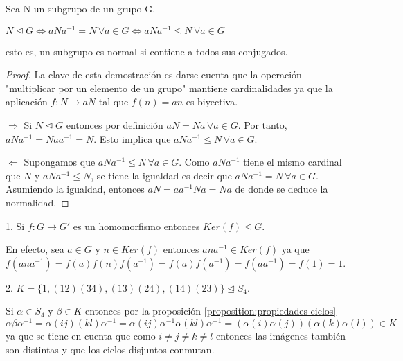 \begin{theorem}\label{theorem:criterio-normalidad}
Sea N un subgrupo de un grupo G. 

$N \unlhd G \iff aNa^{-1} = N  \, \forall a \in G \iff aNa^{-1} \le N \, \forall a \in G$ 

esto es, un subgrupo es normal si contiene a todos sus conjugados.
\end{theorem}
\begin{proof}
La clave de esta demostración es darse cuenta que la operación "multiplicar por un elemento de un grupo" mantiene cardinalidades ya que la aplicación $f:N \rightarrow aN$ tal que $f(n) = an$ es biyectiva.

$\Rightarrow$ Si $N \unlhd G$ entonces por definición $aN = Na \, \forall a \in G$. Por tanto, $aNa^{-1} = Naa^{-1} = N$. Esto implica que $aNa^{-1} \le N \, \forall a \in G$.

$\Leftarrow$ Supongamos que $aNa^{-1} \le N \, \forall a \in G$. Como $aNa^{-1}$ tiene el mismo cardinal que $N$ y $aNa^{-1} \le N$, se tiene la igualdad es decir que $aNa^{-1} = N \, \forall a \in G$. Asumiendo la igualdad, entonces $aN = aa^{-1}Na = Na$ de donde se deduce la normalidad.
\end{proof}

\begin{example}
1. Si $f:G \rightarrow G'$ es un homomorfismo entonces $Ker(f) \trianglelefteq G$.

En efecto, sea $a \in G$ y $n \in Ker(f)$ entonces $ana^{-1} \in Ker(f)$ ya que $f(ana^{-1}) = f(a)f(n)f(a^{-1}) = f(a)f(a^{-1}) = f(aa^{-1}) = f(1) = 1$.

2. $K = \{1,(12)(34),(13)(24),(14)(23)\} \trianglelefteq S_4$.

Si $\alpha \in S_4$ y $\beta \in K$ entonces por la proposición \ref{proposition:propiedades-ciclos} $\alpha \beta  \alpha^{-1} = \alpha (ij)(kl) \alpha^{-1} =\alpha (ij) \alpha^{-1} \alpha (kl) \alpha^{-1} = (\alpha(i) \alpha(j))(\alpha(k) \alpha(l)) \in K$ ya que se tiene en cuenta que como  $i \neq j \neq k \neq l$ entonces las imágenes también son distintas y que los ciclos disjuntos conmutan.
\end{example}


